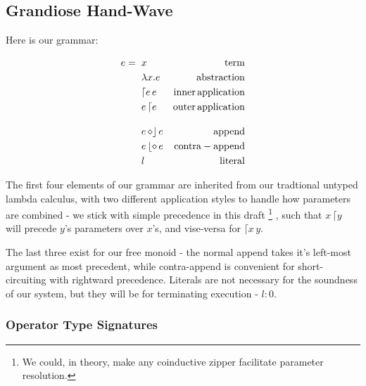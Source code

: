 \documentclass{article}
\begin{document}
\subsection{Grandiose Hand-Wave}

\begin{flushleft}
Here is our grammar:
\end{flushleft}

\begin{align}
e = \hspace{2mm} & x                          & \mathrm{term}\\
                 & \lambda x.e                & \mathrm{abstraction}\\
                 & \lceil e \, e              & \mathrm{inner \, application}\\
                 & e \, \lceil e              & \mathrm{outer \, application}\\[1em]
                 & e \, \diamond \rfloor \, e & \mathrm{append}\\
                 & e \, \lfloor \diamond \, e & \mathrm{contra-append}\\
                 & l                          & \mathrm{literal}
\end{align}

\begin{flushleft}
The first four elements of our grammar are inherited from our tradtional untyped
lambda calculus, with two different application styles to handle how parameters
are combined - we stick with simple precedence in this draft
\footnote{
  We could, in theory, make any coinductive zipper facilitate parameter resolution.
}
, such that
$x \, \lceil y$ will precede $y$'s parameters over $x$'s, and vise-versa for
$\lceil x \, y$.\\
\vspace{2mm}

The last three exist for our free monoid - the normal append takes it's left-most
argument as most precedent, while contra-append is convenient for short-circuiting
with rightward precedence.
Literals are not necessary for the soundness of our system, but they will be for
terminating execution - $l : 0$.
\end{flushleft}

\subsubsection{Operator Type Signatures}
\end{document}
